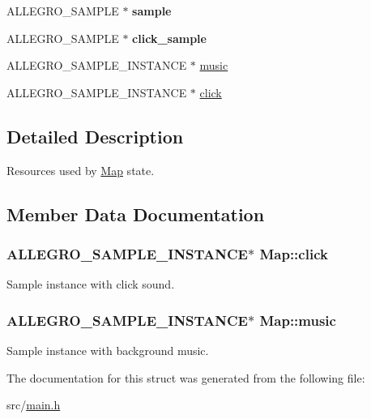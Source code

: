 \begin{DoxyCompactItemize}
\item 
\hypertarget{structMap_a3334bc47109df8757b77c9d3bf67ec5f}{\-A\-L\-L\-E\-G\-R\-O\-\_\-\-S\-A\-M\-P\-L\-E $\ast$ {\bfseries sample}}\label{structMap_a3334bc47109df8757b77c9d3bf67ec5f}

\item 
\hypertarget{structMap_abcd15a027ece6075efe4baaf99c7595d}{\-A\-L\-L\-E\-G\-R\-O\-\_\-\-S\-A\-M\-P\-L\-E $\ast$ {\bfseries click\-\_\-sample}}\label{structMap_abcd15a027ece6075efe4baaf99c7595d}

\item 
\-A\-L\-L\-E\-G\-R\-O\-\_\-\-S\-A\-M\-P\-L\-E\-\_\-\-I\-N\-S\-T\-A\-N\-C\-E $\ast$ \hyperlink{structMap_a17ae4f61c1209816b26940d1c8a88f68}{music}
\item 
\-A\-L\-L\-E\-G\-R\-O\-\_\-\-S\-A\-M\-P\-L\-E\-\_\-\-I\-N\-S\-T\-A\-N\-C\-E $\ast$ \hyperlink{structMap_a32370a5fb75fcf7d0bebd210cb2a0985}{click}
\end{DoxyCompactItemize}


\subsection{\-Detailed \-Description}
\-Resources used by \hyperlink{structMap}{\-Map} state. 

\subsection{\-Member \-Data \-Documentation}
\hypertarget{structMap_a32370a5fb75fcf7d0bebd210cb2a0985}{
\subsubsection[{click}]{\setlength{\rightskip}{0pt plus 5cm}\-A\-L\-L\-E\-G\-R\-O\-\_\-\-S\-A\-M\-P\-L\-E\-\_\-\-I\-N\-S\-T\-A\-N\-C\-E$\ast$ {\bf \-Map\-::click}}}\label{structMap_a32370a5fb75fcf7d0bebd210cb2a0985}
\-Sample instance with click sound. \hypertarget{structMap_a17ae4f61c1209816b26940d1c8a88f68}{
\subsubsection[{music}]{\setlength{\rightskip}{0pt plus 5cm}\-A\-L\-L\-E\-G\-R\-O\-\_\-\-S\-A\-M\-P\-L\-E\-\_\-\-I\-N\-S\-T\-A\-N\-C\-E$\ast$ {\bf \-Map\-::music}}}\label{structMap_a17ae4f61c1209816b26940d1c8a88f68}
\-Sample instance with background music. 

\-The documentation for this struct was generated from the following file\-:\begin{DoxyCompactItemize}
\item 
src/\hyperlink{main_8h}{main.\-h}\end{DoxyCompactItemize}
